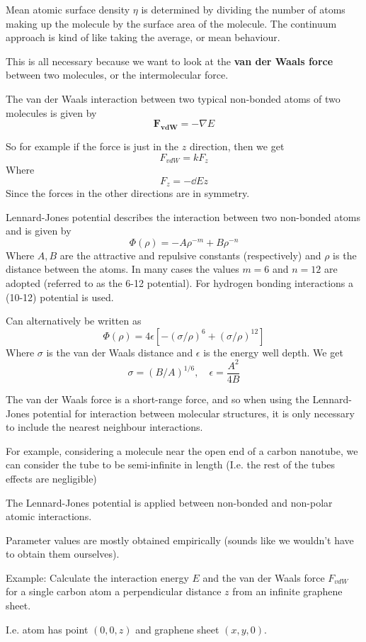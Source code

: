 \documentclass{E:/Documents/Latex/myassignment}
\begin{document}
Mean atomic surface density $\eta$ is determined by dividing the number of atoms making up the molecule by the surface area of the molecule. 
The continuum approach is kind of like taking the average, or mean behaviour.

This is all necessary because we want to look at the \textbf{van der Waals force} between two molecules, or the intermolecular force. 

The van der Waals interaction between two typical non-bonded atoms of two molecules is given by
\[\mathbf{F_{vdW}} = -\nabla E\]

So for example if the force is just in the $z$ direction, then we get
\[F_{vdW} = kF_z\]
Where
\[F_z = - \dd Ez\]
Since the forces in the other directions are in symmetry.

Lennard-Jones potential describes the interaction between two non-bonded atoms and is given by
\[\Phi(\rho) = -A\rho^{-m} + B\rho^{-n}\]
Where $A,B$ are the attractive and repulsive constants (respectively) and $\rho$ is the distance between the atoms. In many cases the values $m = 6$ and $n=12$ are adopted (referred to as the 6-12 potential). For hydrogen bonding interactions a (10-12) potential is used.

Can alternatively be written as
\[\Phi(\rho) = 4 \epsilon \left[ - \left(\sigma/\rho\right)^{6} + \left(\sigma/\rho\right)^{12}\right]\]
Where $\sigma$ is the van der Waals distance and $\epsilon$ is the energy well depth. We get
\[\sigma = \left(B/A\right)^{1/6},\quad \epsilon = \frac{A^2}{4B}\]

The van der Waals force is a short-range force, and so when using the Lennard-Jones potential for interaction between molecular structures, it is only necessary to include the nearest neighbour interactions.

For example, considering a molecule near the open end of a carbon nanotube, we can consider the tube to be semi-infinite in length (I.e. the rest of the tubes effects are negligible)


The Lennard-Jones potential is applied between non-bonded and non-polar atomic interactions.

Parameter values are mostly obtained empirically (sounds like we wouldn't have to obtain them ourselves). 

Example: Calculate the interaction energy $E$ and the van der Waals force $F_{vdW}$ for a single carbon atom a perpendicular distance $z$ from an infinite graphene sheet.

I.e. atom has point $(0,0,z)$ and graphene sheet $(x,y,0)$.
\end{document}
